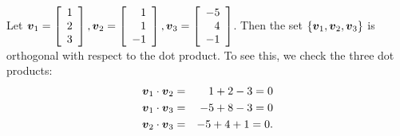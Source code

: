 \begin{Exam}\label{exam:4.2orthobasis} Let  $\boldsymbol v_1 = \left[\begin{array}{r} 1\\2\\3 \end{array}\right], \boldsymbol v_2 = \left[\begin{array}{r} 1\\1\\-1 \end{array}\right], \boldsymbol v_3 = \left[\begin{array}{r} -5\\4\\-1 \end{array}\right]$. Then the set $\{\boldsymbol v_1, \boldsymbol v_2, \boldsymbol v_3\}$ is orthogonal with respect to the dot product. To see this, we check the three dot products:
\begin{eqnarray*}
\boldsymbol v_1\cdot \boldsymbol v_2 &=& 1+2-3 = 0\\
\boldsymbol v_1\cdot \boldsymbol v_3 &=& -5+8-3 =0\\
\boldsymbol v_2\cdot \boldsymbol v_3 &=& -5+4+1 = 0.
\end{eqnarray*}
\end{Exam}


